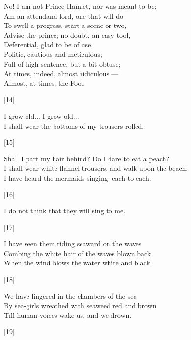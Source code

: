 \documentclass{article}
\begin{document}
\begin{minipage}{8cm}
    No! I am not Prince Hamlet, nor was meant to be;\\
    Am an attendand lord, one that will do\\
    To swell a progress, start a scene or two,\\
    Advise the prince; no doubt, an easy tool,\\
    Deferential, glad to be of use,\\
    Politic, cautious and meticulous;\\
    Full of high sentence, but a bit obtuse;\\
    At times, indeed, almost ridiculous ---\\
    Almost, at times, the Fool.\\
    \begin{center}[14]\end{center}
\end{minipage}

\begin{minipage}{10cm}
    I grow old... I grow old...\\
    I shall wear the bottoms of my trousers rolled.
    \begin{center}[15]\end{center}

    Shall I part my hair behind? Do I dare to eat a peach?\\
    I shall wear white flannel trousers, and walk upon the beach.\\
    I have heard the mermaids singing, each to each.
    \begin{center}[16]\end{center}

    I do not think that they will sing to me.
    \begin{center}[17]\end{center}

    I have seen them riding seaward on the waves\\
    Combing the white hair of the waves blown back\\
    When the wind blows the water white and black.
    \begin{center}[18]\end{center}
\end{minipage}

\begin{minipage}{8cm}
    We have lingered in the chambers of the sea\\
    By sea-girls wreathed with seaweed red and brown\\
    Till human voices wake us, and we drown.
    \begin{center}[19]\end{center}
\end{minipage}
\end{document}
